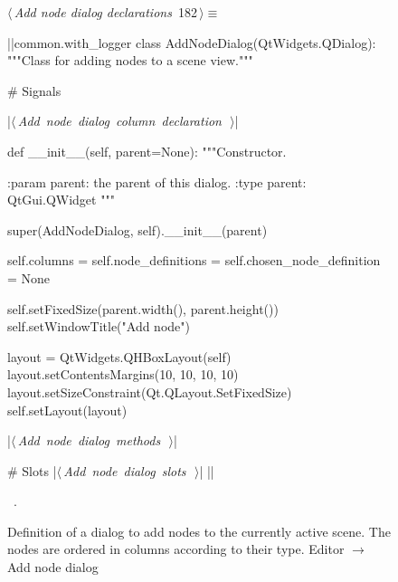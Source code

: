 \documentclass[%
    a4paper,    %
    justified,  %
    nobib,      %
    openany     %
]{tufte-book}
\makeatletter
\renewcommand{\label}[1]{\@tufte@label{##1}}%
\makeatother
\begin{document}
\begin{figure}[!htbp]
\begin{flushleft} \small
\begin{minipage}{\linewidth}\label{scrap154}\raggedright\small
{} $\langle\,${\itshape Add node dialog declarations}\nobreak\ {\footnotesize {182}}$\,\rangle\equiv$
\vspace{-1ex}
\begin{pythoncode}
|\normalfont{}\fontfamily{}|common.with_logger
class AddNodeDialog(QtWidgets.QDialog):
    """Class for adding nodes to a scene view."""

    # Signals

    |\hbox{$\langle\,${\itshape Add node dialog column declaration}\nobreak\ {\footnotesize {}}$\,\rangle$}|

    def __init__(self, parent=None):
        """Constructor.

        :param parent: the parent of this dialog.
        :type  parent: QtGui.QWidget
        """

        super(AddNodeDialog, self).__init__(parent)

        self.columns                = {}
        self.node_definitions       = {}
        self.chosen_node_definition = None

        self.setFixedSize(parent.width(), parent.height())
        self.setWindowTitle("Add node")

        layout = QtWidgets.QHBoxLayout(self)
        layout.setContentsMargins(10, 10, 10, 10)
        layout.setSizeConstraint(Qt.QLayout.SetFixedSize)
        self.setLayout(layout)

    |\hbox{$\langle\,${\itshape Add node dialog methods}\nobreak\ {\footnotesize {}}$\,\rangle$}|

    # Slots
    |\hbox{$\langle\,${\itshape Add node dialog slots}\nobreak\ {\footnotesize {}}$\,\rangle$}|
|\NWsep|
\end{pythoncode}
\vspace{1.5ex}
\footnotesize
\begin{list}{}{\setlength{\itemsep}{-\parsep}\setlength{\itemindent}{-\leftmargin}}
\item \NWtxtMacroRefIn\ .

\item{}
\end{list}
\end{minipage}\vspace{4ex}
\end{flushleft}
\caption{Definition of a dialog to add nodes to the currently active scene. The
  nodes are ordered in columns according to their type.
  \newline{}\newline{}Editor $\rightarrow$ Add node dialog}
\end{figure}
\end{document}
